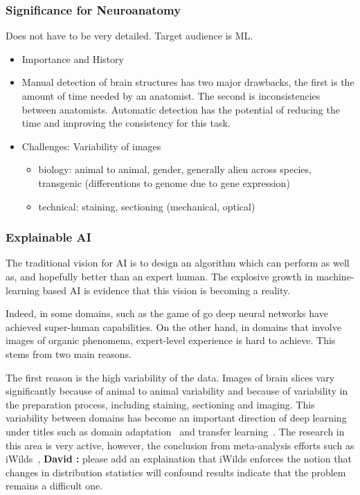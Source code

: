 \documentclass[runningheads]{llncs}
\newcommand{\comment}[3]{{\color{#1} {\bf #2 :} #3}}
\newcommand{\david}[1]{\comment{cyan}{David}{#1}}
\begin{document}
\subsubsection {Significance for Neuroanatomy}
Does not have to be very detailed. Target audience is ML.
\begin{itemize}
\item Importance and History
\item Manual detection of brain structures has two major drawbacks, the first is the amount of time needed by an anatomist. The second is inconsistencies between anatomists. Automatic detection has the potential of reducing the time and improving the consistency for this task.
\item Challenges: Variability of images
    \begin{itemize}
        \item biology: animal to animal, gender, generally alien across species, transgenic (differentions to genome due to gene expression)
        \item technical: staining, sectioning (mechanical, optical)
    \end{itemize}
  \end{itemize}
  
\subsubsection{Explainable AI} The traditional vision for AI is to design
an algorithm which can perform as well as, and hopefully better than
an expert human. The explosive growth in machine-learning based AI is
evidence that this vision is becoming a reality.

Indeed, in some domains, such as the game of go \cite{} deep neural
networks have achieved super-human capabilities. On the other hand, in
domains that involve images of organic phenomena, expert-level
experience is hard to achieve. This stems from two main reasons.

The first reason is the high variability of the data. Images
of brain slices vary significantly because of animal to animal
variability and because of variability in the preparation process,
including staining, sectioning and imaging. This variability between
domains has become an important direction of deep learning under
titles such as domain adaptation~\cite{wang2018deep} and transfer
learning~\cite{weiss2016survey}. The research in this area is very
active, however, the conclusion from meta-analysis efforts such as
iWilds~\cite{}, \david{please add an explaination that iWilds enforces the notion that changes in distribution statistics will confound results} indicate that the problem remains a difficult one.
\end{document}
